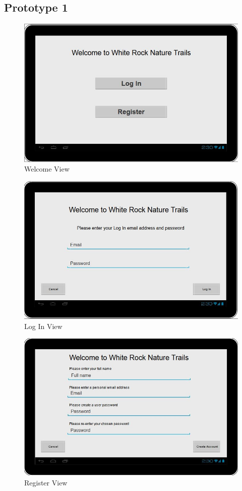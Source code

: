 \documentclass[11pt,a4paper]{article}
\begin{document}
\begin{appendices}

\section{Prototype 1}
\label{sec:appendPro1}


\begin{figure}[H]
\centering
\includegraphics[width=0.6\linewidth]{./img/proto1start}
\caption{Welcome View}
\end{figure}

\begin{figure}[H]
\centering
\includegraphics[width=0.6\linewidth]{./img/proto1Log}
\caption{Log In View}
\end{figure}

\begin{figure}[H]
\centering
\includegraphics[width=0.6\linewidth]{./img/proto1register}
\caption{Register View}
\end{figure}


\end{appendices}
\end{document}
